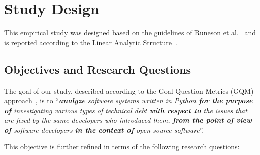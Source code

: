 \documentclass[sigconf,review]{acmart}
\begin{document}



\section{Study Design}

This empirical study was designed
based on the guidelines of Runeson et al.~\cite{Runeson:12} 
and is reported according to 
the Linear Analytic Structure~\cite{Runeson:12}.

\subsection{Objectives and Research Questions}
The goal of our study, 
described according to 
the Goal-Question-Metrics (GQM) approach~\cite{Solingen:02}, is to 
``\textit{\textbf{analyze} 
software systems written in Python 
\textbf{for the purpose of} 
investigating various types of technical debt 
\textbf{with respect to} 
the issues that are fixed
by the same developers who introduced them, 
\textbf{from the point of view of} 
software developers 
\textbf{in the context of}
open source software}''. 

This objective is further refined in terms of the following research questions:
\end{document}
